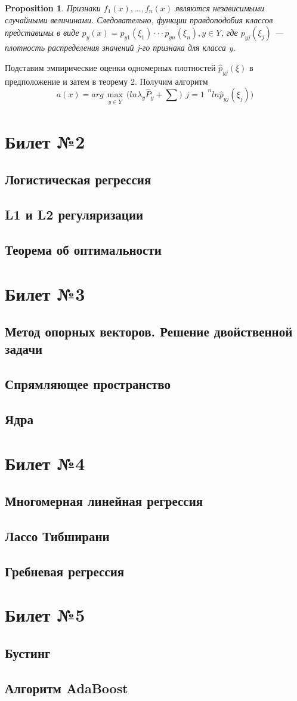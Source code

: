 \documentclass[a4paper]{article}
\theoremstyle{plain}
\newtheorem{proposition}{Proposition}
\theoremstyle{remark}
\theoremstyle{definition}
\begin{document}
\begin{proposition}
Признаки $f_1(x),\ldots, f_n(x)$ являются независимыми случайными величинами. Следовательно, функции правдоподобия классов представимы в виде $p_y(x) = p_{y1}(\xi_1)· · · p_{yn}(\xi_n), y \in Y$, где $p_{yj} (\xi_j )$ — плотность распределения значений j-го признака для класса y.
\end{proposition}
Подставим эмпирические оценки одномерных плотностей $\hat{p}_{yj} (\xi)$ в предположение и затем в теорему 2. Получим алгоритм
$$ a(x) = arg \max_{\substack{y \in Y}} \bigg( ln \lambda_y \hat{P}_y + \sum){\substack{j=1}}^n ln \hat{p}_{yj}(\xi_j) \bigg) $$


\section{Билет №2}
\subsection{Логистическая регрессия}
\subsection{L1 и L2 регуляризации}
\subsection{Теорема об оптимальности}

\section{Билет №3}
\subsection{Метод опорных векторов. Решение двойственной задачи}
\subsection{Спрямляющее пространство}
\subsection{Ядра}

\section{Билет №4}
\subsection{Многомерная линейная регрессия}
\subsection{Лассо Тибширани}
\subsection{Гребневая регрессия}

\section{Билет №5}
\subsection{Бустинг}
\subsection{Алгоритм AdaBoost}
\end{document}
